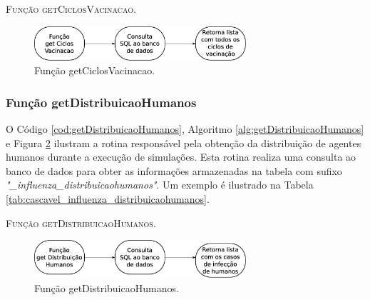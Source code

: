 

\begin{algorithm}[H]
   \SetAlgoLined   
   
   \caption{\textsc{Função getCiclosVacinacao.}}
   \label{alg:getCiclosVacinacao}
\end{algorithm}

\begin{figure}[H]
  \centering
  \includegraphics[width=0.7\textwidth]{Figuras/Simula/Fluxos/getCiclosVacinacao.eps}
  \caption{Função getCiclosVacinacao.}
  \label{fig:getCiclosVacinacao}
\end{figure} 

\newpage

\subsubsection{Função getDistribuicaoHumanos}

O Código \ref{cod:getDistribuicaoHumanos}, Algoritmo \ref{alg:getDistribuicaoHumanos} e Figura \ref{fig:getDistribuicaoHumanos} ilustram a rotina responsável pela obtenção da distribuição de agentes humanos durante a execução de simulações. Esta rotina realiza uma consulta ao banco de dados para obter as informações armazenadas na tabela com sufixo \textit{"\_influenza\_distribuicaohumanos"}. Um exemplo é ilustrado na Tabela \ref{tab:cascavel_influenza_distribuicaohumanos}.



\begin{algorithm}[H]
   \SetAlgoLined   
   
   \caption{\textsc{Função getDistribuicaoHumanos.}}
   \label{alg:getDistribuicaoHumanos}
\end{algorithm}

\begin{figure}[H]
  \centering
  \includegraphics[width=0.7\textwidth]{Figuras/Simula/Fluxos/getDistribuicaoHumanos.eps}
  \caption{Função getDistribuicaoHumanos.}
  \label{fig:getDistribuicaoHumanos}
\end{figure} 

